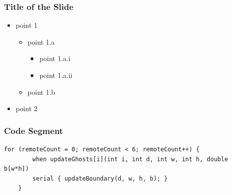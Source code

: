 \documentclass{beamer}
\begin{document}
\begin{frame}[fragile]

  \frametitle{Title of the Slide}

  \begin{itemize}
    \item point 1
      \begin{itemize}
      \item point 1.a
        \begin{itemize}
        \item point 1.a.i
        \item point 1.a.ii
        \end{itemize}
      \item point 1.b
      \end{itemize}
    \item point 2
  \end{itemize}
\end{frame}

\begin{frame}[fragile]
  \frametitle{Code Segment}

  \begin{lstlisting}[basicstyle=\footnotesize]
    for (remoteCount = 0; remoteCount < 6; remoteCount++) {
        when updateGhosts[i](int i, int d, int w, int h, double b[w*h])
        serial { updateBoundary(d, w, h, b); }
    }
  \end{lstlisting}

\end{frame}
\end{document}
